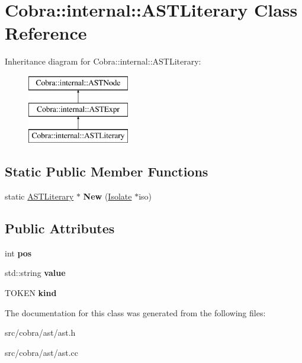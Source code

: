 \hypertarget{class_cobra_1_1internal_1_1_a_s_t_literary}{\section{Cobra\+:\+:internal\+:\+:A\+S\+T\+Literary Class Reference}
\label{class_cobra_1_1internal_1_1_a_s_t_literary}
}
Inheritance diagram for Cobra\+:\+:internal\+:\+:A\+S\+T\+Literary\+:\begin{figure}[H]
\begin{center}
\leavevmode
\includegraphics[height=3.000000cm]{class_cobra_1_1internal_1_1_a_s_t_literary}
\end{center}
\end{figure}
\subsection*{Static Public Member Functions}
\begin{DoxyCompactItemize}
\item 
\hypertarget{class_cobra_1_1internal_1_1_a_s_t_literary_a01581f3e5ee5779e4fe4af943763bf4e}{static \hyperlink{class_cobra_1_1internal_1_1_a_s_t_literary}{A\+S\+T\+Literary} $\ast$ {\bfseries New} (\hyperlink{class_cobra_1_1internal_1_1_isolate}{Isolate} $\ast$iso)}\label{class_cobra_1_1internal_1_1_a_s_t_literary_a01581f3e5ee5779e4fe4af943763bf4e}

\end{DoxyCompactItemize}
\subsection*{Public Attributes}
\begin{DoxyCompactItemize}
\item 
\hypertarget{class_cobra_1_1internal_1_1_a_s_t_literary_ab3070fdd1d7d1c311a08c66a5ee3d595}{int {\bfseries pos}}\label{class_cobra_1_1internal_1_1_a_s_t_literary_ab3070fdd1d7d1c311a08c66a5ee3d595}

\item 
\hypertarget{class_cobra_1_1internal_1_1_a_s_t_literary_a15748fbb3c828911da66b91924ca6b38}{std\+::string {\bfseries value}}\label{class_cobra_1_1internal_1_1_a_s_t_literary_a15748fbb3c828911da66b91924ca6b38}

\item 
\hypertarget{class_cobra_1_1internal_1_1_a_s_t_literary_ae73b054aee4668feebb7cfe435a5393b}{T\+O\+K\+E\+N {\bfseries kind}}\label{class_cobra_1_1internal_1_1_a_s_t_literary_ae73b054aee4668feebb7cfe435a5393b}

\end{DoxyCompactItemize}


The documentation for this class was generated from the following files\+:\begin{DoxyCompactItemize}
\item 
src/cobra/ast/ast.\+h\item 
src/cobra/ast/ast.\+cc\end{DoxyCompactItemize}
